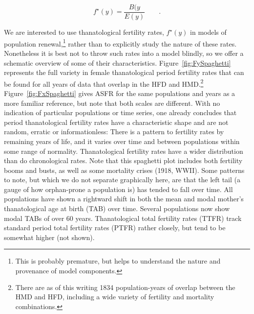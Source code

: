 \documentclass{article}
\newcommand{\ep}{\quad\quad\text{.}}
\begin{document}
\begin{equation}
f^\star(y) = \frac{B(y}{E(y)} \ep
\end{equation}

We are interested to use thanatological fertility rates, $f^\star(y)$ in
models of population renewal,\footnote{This is probably premature, but helps to
understand the nature and provenance of model components.} rather than to
explicitly study the nature of these rates. Nonetheless it is best not to throw such rates into a model blindly, so we offer a schematic overview of some of their characteristics.
Figure~\ref{fig:FySpaghetti} represents the full variety in
female thanatological period fertility rates that can be found for all years
of data that overlap in the HFD and HMD.\footnote{There are as of this writing
1834 population-years of overlap between the HMD and HFD, including a wide
variety of fertility and mortality combinations.} Figure~\ref{fig:FxSpaghetti} gives ASFR for the same
populations and years as a more familiar reference, but note that both scales
are different. With no indication of particular populations or time series, one
already concludes that period thanatological fertility rates have a
characteristic shape and are not random, erratic or informationless: There is a
pattern to fertility rates by remaining years of life, and it varies over time
and between populations within some range of normality. Thanatological fertility
rates have a wider distribution than do chronological rates. Note that this
spaghetti plot includes both fertility booms and busts, as well as some
mortality crises (1918, WWII). Some patterns to note, but which we do not
separate graphically here, are that the left tail (a gauge of how orphan-prone a
population is) has tended to fall over time. All populations have shown a
rightward shift in both the mean and modal mother's thanatological age at birth
(TAB) over time. Several
populations now show modal TABs of over 60 years. Thanatological total fertility rates (TTFR)
track standard period total fertility rates (PTFR) rather closely, but tend to
be somewhat higher (not shown).
\end{document}
